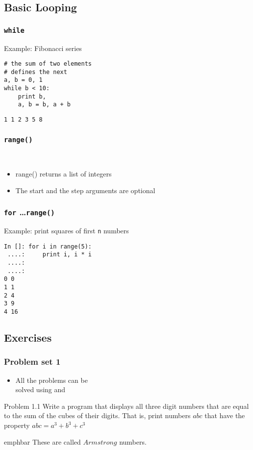 \documentclass[14pt,compress]{beamer}
\newcommand{\emphbar}[1]
{\begin{beamercolorbox}[rounded=true]{emphbar} 
      {#1}
 \end{beamercolorbox}
}
\newcounter{time}
\newcommand{\inctime}[1]{\addtocounter{time}{#1}{\tiny \thetime\ m}}
\newcommand{\typ}[1]{\texttt{#1}}
\newcommand{\kwrd}[1]{ \texttt{\textbf{\color{blue}{#1}}}  }
\begin{document}
\subsection{Basic Looping}
\begin{frame}[fragile]
  \frametitle{\typ{while}}
Example: Fibonacci series
  \begin{lstlisting}
# the sum of two elements
# defines the next
a, b = 0, 1
while b < 10:
    print b,
    a, b = b, a + b 
\end{lstlisting}
\typ{1 1 2 3 5 8}\\  
\end{frame}

\begin{frame}[fragile]
\frametitle{\typ{range()}}
\kwrd{range([start,] stop[, step])}\\
\begin{itemize}
  \item \alert {range() returns a list of integers}
  \item \alert {The start and the step arguments are optional}  
\end{itemize}
\end{frame}

\begin{frame}[fragile]
  \frametitle{\typ{for} \ldots \typ{range()}}
Example: print squares of first \typ{n} numbers
  \begin{lstlisting}
In []: for i in range(5):
 ....:     print i, i * i
 ....:     
 ....:     
0 0
1 1
2 4
3 9
4 16
\end{lstlisting}
\inctime{15}
\end{frame}

\subsection{Exercises}
\begin{frame}
  \frametitle{Problem set 1}
  \begin{itemize}
    \item All the problems can be\\
      solved using \kwrd{if} and \kwrd{while} 
  \end{itemize}
\end{frame}

\begin{frame}{Problem 1.1}
  Write a program that displays all three digit numbers that are equal to the sum of the cubes of their digits. That is, print numbers $abc$ that have the property $abc = a^3 + b^3 + c^3$\\
\vspace*{0.2in}
\emphbar{These are called $Armstrong$ numbers.}
\end{frame}
  
\end{document}
